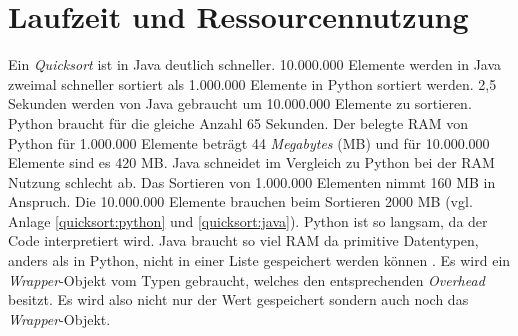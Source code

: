 \section{Laufzeit und Ressourcennutzung}
Ein \textit{Quicksort} ist in Java deutlich schneller. 10.000.000  Elemente werden in Java zweimal schneller sortiert als 1.000.000 Elemente in Python sortiert werden. 2,5 Sekunden werden von Java gebraucht um 10.000.000 Elemente zu sortieren. Python braucht für die gleiche Anzahl 65 Sekunden. Der belegte RAM von Python für 1.000.000 Elemente beträgt 44 \textit{Megabytes} (MB) und für 10.000.000 Elemente sind es 420 MB. Java schneidet im Vergleich zu Python bei der RAM Nutzung schlecht ab. Das Sortieren von 1.000.000 Elementen nimmt 160 MB in Anspruch. Die 10.000.000 Elemente brauchen beim Sortieren 2000 MB (vgl. Anlage \ref{quicksort:python} und \ref{quicksort:java}). Python ist so langsam, da der Code interpretiert wird. Java braucht so viel RAM da primitive Datentypen, anders als in Python, nicht in einer Liste gespeichert werden können \cite{Louis:2010}. Es wird ein \textit{Wrapper}-Objekt vom Typen  gebraucht, welches den entsprechenden \textit{Overhead} besitzt. Es wird also nicht nur der Wert gespeichert sondern auch noch das \textit{Wrapper}-Objekt.
